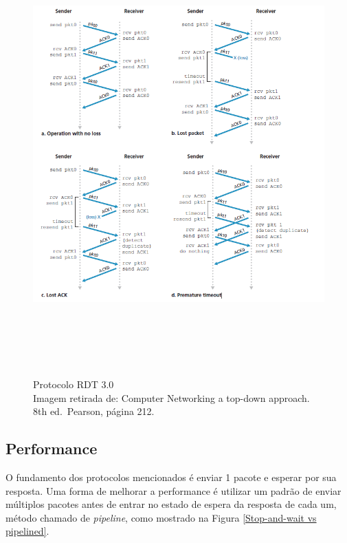\begin{figure}[h!]
\centering
\includegraphics[keepaspectratio, width=14cm, height=17cm]{imagens/11/11 - rdt 3.0.png}
\caption{Protocolo RDT 3.0  \\
Imagem retirada de: Computer Networking a top-down approach. 8th
ed.~Pearson, página 212. \\}
\label{Protocolo RDT 3.0}
\end{figure}



\hypertarget{performance}{%
\subsection{Performance}\label{performace}}

O fundamento dos protocolos mencionados é enviar 1 pacote e esperar por
sua resposta. Uma forma de melhorar a performance é utilizar um padrão de
enviar múltiplos pacotes antes de entrar no estado de espera da resposta
de cada um, método chamado de \emph{pipeline}, como mostrado na Figura
\ref{Stop-and-wait vs pipelined}.


